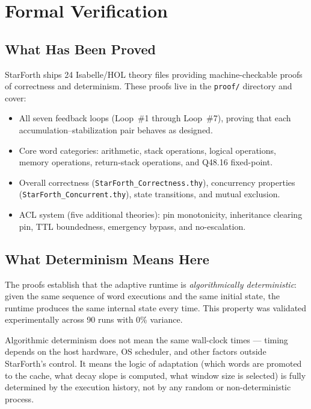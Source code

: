 \chapter{Formal Verification}
\label{chap:formal-verification}

\section{What Has Been Proved}
\label{sec:proofs-overview}

StarForth ships 24 Isabelle/HOL theory files providing machine-checkable
proofs of correctness and determinism. These proofs live in the \texttt{proof/}
directory and cover:

\begin{itemize}
  \item All seven feedback loops (Loop~\#1 through Loop~\#7), proving that
    each accumulation--stabilization pair behaves as designed.
  \item Core word categories: arithmetic, stack operations, logical operations,
    memory operations, return-stack operations, and Q48.16 fixed-point.
  \item Overall correctness (\texttt{StarForth\_Correctness.thy}), concurrency
    properties (\texttt{StarForth\_Concurrent.thy}), state transitions, and
    mutual exclusion.
  \item ACL system (five additional theories): pin monotonicity, inheritance
    clearing pin, TTL boundedness, emergency bypass, and no-escalation.
\end{itemize}

\section{What Determinism Means Here}
\label{sec:determinism}

The proofs establish that the adaptive runtime is \emph{algorithmically
deterministic}: given the same sequence of word executions and the same
initial state, the runtime produces the same internal state every time.
This property was validated experimentally across 90 runs with 0\% variance.

Algorithmic determinism does not mean the same wall-clock times --- timing
depends on the host hardware, OS scheduler, and other factors outside StarForth's
control. It means the logic of adaptation (which words are promoted to the cache,
what decay slope is computed, what window size is selected) is fully determined
by the execution history, not by any random or non-deterministic process.


